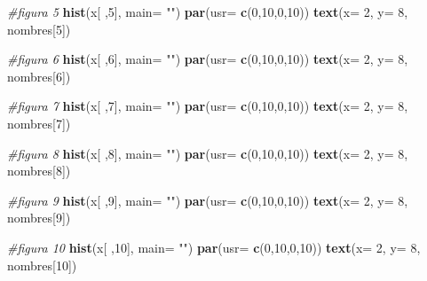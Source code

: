 \documentclass[]{book}
\newenvironment{Shaded}{\begin{snugshade}}{\end{snugshade}}
\newcommand{\CommentTok}[1]{\textcolor[rgb]{0.56,0.35,0.01}{\textit{#1}}}
\newcommand{\DataTypeTok}[1]{\textcolor[rgb]{0.13,0.29,0.53}{#1}}
\newcommand{\DecValTok}[1]{\textcolor[rgb]{0.00,0.00,0.81}{#1}}
\newcommand{\KeywordTok}[1]{\textcolor[rgb]{0.13,0.29,0.53}{\textbf{#1}}}
\newcommand{\NormalTok}[1]{#1}
\newcommand{\StringTok}[1]{\textcolor[rgb]{0.31,0.60,0.02}{#1}}
\begin{document}
\begin{Shaded}
\begin{Highlighting}[]
\CommentTok{#figura 5}
\KeywordTok{hist}\NormalTok{(x[ ,}\DecValTok{5}\NormalTok{], }\DataTypeTok{main=} \StringTok{""}\NormalTok{)}
\KeywordTok{par}\NormalTok{(}\DataTypeTok{usr=} \KeywordTok{c}\NormalTok{(}\DecValTok{0}\NormalTok{,}\DecValTok{10}\NormalTok{,}\DecValTok{0}\NormalTok{,}\DecValTok{10}\NormalTok{))}
\KeywordTok{text}\NormalTok{(}\DataTypeTok{x=} \DecValTok{2}\NormalTok{, }\DataTypeTok{y=} \DecValTok{8}\NormalTok{, nombres[}\DecValTok{5}\NormalTok{])}

\CommentTok{#figura 6}
\KeywordTok{hist}\NormalTok{(x[ ,}\DecValTok{6}\NormalTok{], }\DataTypeTok{main=} \StringTok{""}\NormalTok{)}
\KeywordTok{par}\NormalTok{(}\DataTypeTok{usr=} \KeywordTok{c}\NormalTok{(}\DecValTok{0}\NormalTok{,}\DecValTok{10}\NormalTok{,}\DecValTok{0}\NormalTok{,}\DecValTok{10}\NormalTok{))}
\KeywordTok{text}\NormalTok{(}\DataTypeTok{x=} \DecValTok{2}\NormalTok{, }\DataTypeTok{y=} \DecValTok{8}\NormalTok{, nombres[}\DecValTok{6}\NormalTok{])}

\CommentTok{#figura 7}
\KeywordTok{hist}\NormalTok{(x[ ,}\DecValTok{7}\NormalTok{], }\DataTypeTok{main=} \StringTok{""}\NormalTok{)}
\KeywordTok{par}\NormalTok{(}\DataTypeTok{usr=} \KeywordTok{c}\NormalTok{(}\DecValTok{0}\NormalTok{,}\DecValTok{10}\NormalTok{,}\DecValTok{0}\NormalTok{,}\DecValTok{10}\NormalTok{))}
\KeywordTok{text}\NormalTok{(}\DataTypeTok{x=} \DecValTok{2}\NormalTok{, }\DataTypeTok{y=} \DecValTok{8}\NormalTok{, nombres[}\DecValTok{7}\NormalTok{])}

\CommentTok{#figura 8}
\KeywordTok{hist}\NormalTok{(x[ ,}\DecValTok{8}\NormalTok{], }\DataTypeTok{main=} \StringTok{""}\NormalTok{)}
\KeywordTok{par}\NormalTok{(}\DataTypeTok{usr=} \KeywordTok{c}\NormalTok{(}\DecValTok{0}\NormalTok{,}\DecValTok{10}\NormalTok{,}\DecValTok{0}\NormalTok{,}\DecValTok{10}\NormalTok{))}
\KeywordTok{text}\NormalTok{(}\DataTypeTok{x=} \DecValTok{2}\NormalTok{, }\DataTypeTok{y=} \DecValTok{8}\NormalTok{, nombres[}\DecValTok{8}\NormalTok{])}

\CommentTok{#figura 9}
\KeywordTok{hist}\NormalTok{(x[ ,}\DecValTok{9}\NormalTok{], }\DataTypeTok{main=} \StringTok{""}\NormalTok{)}
\KeywordTok{par}\NormalTok{(}\DataTypeTok{usr=} \KeywordTok{c}\NormalTok{(}\DecValTok{0}\NormalTok{,}\DecValTok{10}\NormalTok{,}\DecValTok{0}\NormalTok{,}\DecValTok{10}\NormalTok{))}
\KeywordTok{text}\NormalTok{(}\DataTypeTok{x=} \DecValTok{2}\NormalTok{, }\DataTypeTok{y=} \DecValTok{8}\NormalTok{, nombres[}\DecValTok{9}\NormalTok{])}

\CommentTok{#figura 10}
\KeywordTok{hist}\NormalTok{(x[ ,}\DecValTok{10}\NormalTok{], }\DataTypeTok{main=} \StringTok{""}\NormalTok{)}
\KeywordTok{par}\NormalTok{(}\DataTypeTok{usr=} \KeywordTok{c}\NormalTok{(}\DecValTok{0}\NormalTok{,}\DecValTok{10}\NormalTok{,}\DecValTok{0}\NormalTok{,}\DecValTok{10}\NormalTok{))}
\KeywordTok{text}\NormalTok{(}\DataTypeTok{x=} \DecValTok{2}\NormalTok{, }\DataTypeTok{y=} \DecValTok{8}\NormalTok{, nombres[}\DecValTok{10}\NormalTok{])}
\end{Highlighting}
\end{Shaded}
\end{document}
